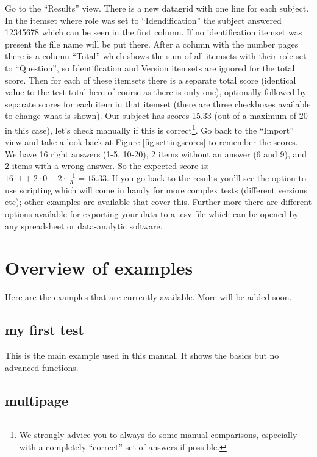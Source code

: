 \documentclass[10pt,a4paper]{article}
\begin{document}
Go to the ``Results'' view. There is a new datagrid with one line for each subject. In the itemset where role was set to ``Idendification'' the subject answered 12345678 which can be seen in the first column. If no identification itemset was present the file name will be put there. After a column with the number pages there is a column ``Total'' which shows the sum of all itemsets with their role set to ``Question'', so Identification and Version itemsets are ignored for the total score. Then for each of these itemsets there is a separate total score (identical value to the test total here of course as there is only one), optionally followed by separate scores for each item in that itemset (there are three checkboxes available to change what is shown). Our subject has scores 15.33 (out of a maximum of 20 in this case), let's check manually if this is correct\footnote{We strongly advice you to always do some manual comparisons, especially with a completely ``correct'' set of answers if possible.}. Go back to the ``Import'' view and take a look back at Figure \ref{fig:settingscores} to remember the scores. We have 16 right answers (1-5, 10-20), 2 items without an answer (6 and 9), and 2 items with a wrong answer. So the expected score is: $16\cdot 1 + 2\cdot 0 + 2\cdot \frac{-1}{3} = 15.33$. If you go back to the results you'll see the option to use scripting which will come in handy for more complex tests (different versions etc); other examples are available that cover this. Further more there are different options available for exporting your data to a .csv file which can be opened by any spreadsheet or data-analytic software.


\section{Overview of examples}

Here are the examples that are currently available. More will be added soon.

\subsection*{my first test}

This is the main example used in this manual. It shows the basics but no advanced functions.


\subsection*{multipage}
\end{document}
